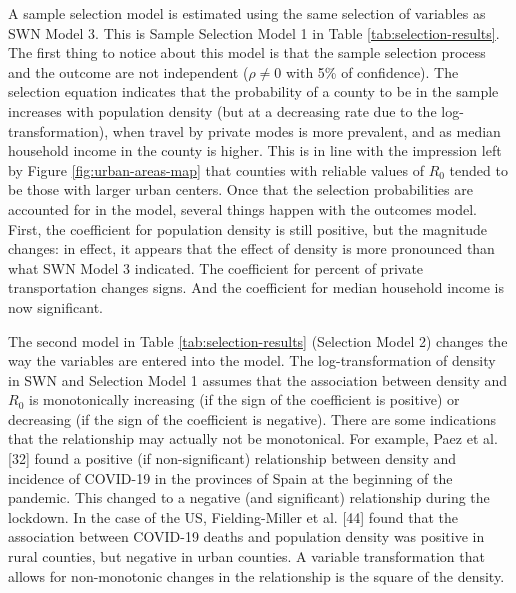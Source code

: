 \documentclass[10pt,letterpaper]{article}
\begin{document}
A sample selection model is estimated using the same selection of
variables as SWN Model 3. This is Sample Selection Model 1 in Table
\ref{tab:selection-results}. The first thing to notice about this model
is that the sample selection process and the outcome are not independent
(\(\rho\ne0\) with 5\% of confidence). The selection equation indicates
that the probability of a county to be in the sample increases with
population density (but at a decreasing rate due to the
log-transformation), when travel by private modes is more prevalent, and
as median household income in the county is higher. This is in line with
the impression left by Figure \ref{fig:urban-areas-map} that counties
with reliable values of \(R_0\) tended to be those with larger urban
centers. Once that the selection probabilities are accounted for in the
model, several things happen with the outcomes model. First, the
coefficient for population density is still positive, but the magnitude
changes: in effect, it appears that the effect of density is more
pronounced than what SWN Model 3 indicated. The coefficient for percent
of private transportation changes signs. And the coefficient for median
household income is now significant.

The second model in Table \ref{tab:selection-results} (Selection Model
2) changes the way the variables are entered into the model. The
log-transformation of density in SWN and Selection Model 1 assumes that
the association between density and \(R_0\) is monotonically increasing
(if the sign of the coefficient is positive) or decreasing (if the sign
of the coefficient is negative). There are some indications that the
relationship may actually not be monotonical. For example, Paez et al.
{[}32{]} found a positive (if non-significant) relationship between
density and incidence of COVID-19 in the provinces of Spain at the
beginning of the pandemic. This changed to a negative (and significant)
relationship during the lockdown. In the case of the US, Fielding-Miller
et al. {[}44{]} found that the association between COVID-19 deaths and
population density was positive in rural counties, but negative in urban
counties. A variable transformation that allows for non-monotonic
changes in the relationship is the square of the density.
\end{document}
